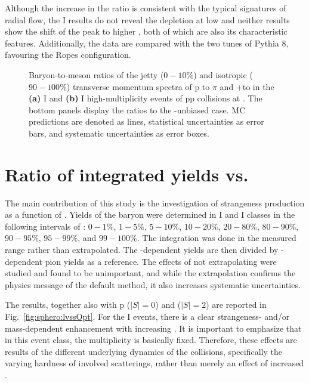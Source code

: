 Although the increase in the ratio is consistent with the typical signatures of radial flow, the \NSPD I results do not reveal the depletion at low \pt and neither results show the shift of the peak to higher \pt, both of which are also its characteristic features. Additionally, the data are compared with the two tunes of Pythia 8, favouring the Ropes configuration.

\begin{figure}[H]
\caption{Baryon-to-meson ratios of the jetty ($0-10\%$) and isotropic ($90-100\%$) transverse momentum spectra of p to $\pi$ and \LA+\AL to \KOs in the \textbf{(a)} \NSPD I and \textbf{(b)} \VOM I high-multiplicity events of pp collisions at . The bottom panels display the ratios to the \SOPT-unbiased case. MC predictions are denoted as lines, statistical uncertainties as error bars, and systematic uncertainties as error boxes.}
\label{fig:sphero:ltok}
\end{figure}

\section{Ratio of integrated yields vs. \SOPT}

The main contribution of this study is the investigation of strangeness production as a function of \SOPT. Yields of the \LA baryon were determined in \NSPD I and \VOM I classes in the following intervals of \SOPT: $0-1\%$, $1-5\%$, $5-10\%$, $10-20\%$, $20-80\%$, $80-90\%$, $90-95\%$, $95-99\%$, and $99-100\%$. The integration was done in the measured \pt range rather than extrapolated. The \SOPT-dependent \LA yields are then divided by \SOPT-dependent pion yields as a reference. The effects of not extrapolating were studied and found to be unimportant, and while the extrapolation confirms the physics message of the default method, it also increases systematic uncertainties. 

The results, together also with p ($|S|=0$) and \XI ($|S|=2$) are reported in Fig.~\ref{fig:sphero:lvssOpt}. For the \NSPD I events, there is a clear strangeness- and/or mass-dependent enhancement with increasing \SOPT. It is important to emphasize that in this event class, the \Nch multiplicity is basically fixed. Therefore, these effects are results of the different underlying dynamics of the collisions, specifically the varying hardness of involved scatterings, rather than merely an effect of increased \Nch.

